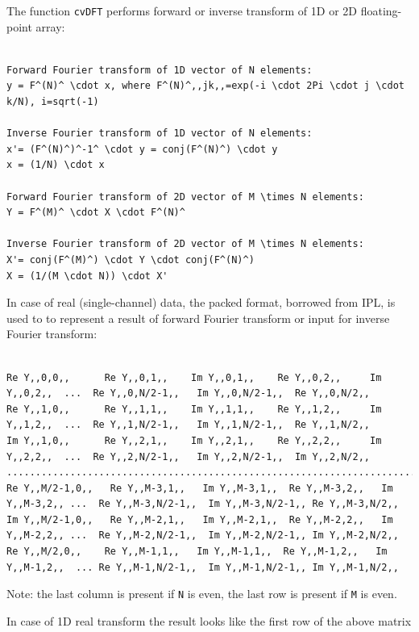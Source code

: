 The function \texttt{cvDFT} performs forward or inverse transform of 1D or 2D floating-point array:

\begin{lstlisting}

Forward Fourier transform of 1D vector of N elements:
y = F^(N)^ \cdot x, where F^(N)^,,jk,,=exp(-i \cdot 2Pi \cdot j \cdot k/N), i=sqrt(-1)

Inverse Fourier transform of 1D vector of N elements:
x'= (F^(N)^)^-1^ \cdot y = conj(F^(N)^) \cdot y
x = (1/N) \cdot x

Forward Fourier transform of 2D vector of M \times N elements:
Y = F^(M)^ \cdot X \cdot F^(N)^

Inverse Fourier transform of 2D vector of M \times N elements:
X'= conj(F^(M)^) \cdot Y \cdot conj(F^(N)^)
X = (1/(M \cdot N)) \cdot X'

\end{lstlisting}

In case of real (single-channel) data, the packed format, borrowed from IPL, is used to to represent a result of forward Fourier transform or input for inverse Fourier transform:

\begin{lstlisting}

Re Y,,0,0,,      Re Y,,0,1,,    Im Y,,0,1,,    Re Y,,0,2,,     Im Y,,0,2,,  ...  Re Y,,0,N/2-1,,   Im Y,,0,N/2-1,,  Re Y,,0,N/2,,
Re Y,,1,0,,      Re Y,,1,1,,    Im Y,,1,1,,    Re Y,,1,2,,     Im Y,,1,2,,  ...  Re Y,,1,N/2-1,,   Im Y,,1,N/2-1,,  Re Y,,1,N/2,,
Im Y,,1,0,,      Re Y,,2,1,,    Im Y,,2,1,,    Re Y,,2,2,,     Im Y,,2,2,,  ...  Re Y,,2,N/2-1,,   Im Y,,2,N/2-1,,  Im Y,,2,N/2,,
............................................................................................
Re Y,,M/2-1,0,,   Re Y,,M-3,1,,   Im Y,,M-3,1,,  Re Y,,M-3,2,,   Im Y,,M-3,2,, ...  Re Y,,M-3,N/2-1,,  Im Y,,M-3,N/2-1,, Re Y,,M-3,N/2,,
Im Y,,M/2-1,0,,   Re Y,,M-2,1,,   Im Y,,M-2,1,,  Re Y,,M-2,2,,   Im Y,,M-2,2,, ...  Re Y,,M-2,N/2-1,,  Im Y,,M-2,N/2-1,, Im Y,,M-2,N/2,,
Re Y,,M/2,0,,    Re Y,,M-1,1,,   Im Y,,M-1,1,,  Re Y,,M-1,2,,   Im Y,,M-1,2,,  ... Re Y,,M-1,N/2-1,,  Im Y,,M-1,N/2-1,, Im Y,,M-1,N/2,,

\end{lstlisting}

Note: the last column is present if \texttt{N} is even, the last row is present if \texttt{M} is even.

In case of 1D real transform the result looks like the first row of the above matrix


